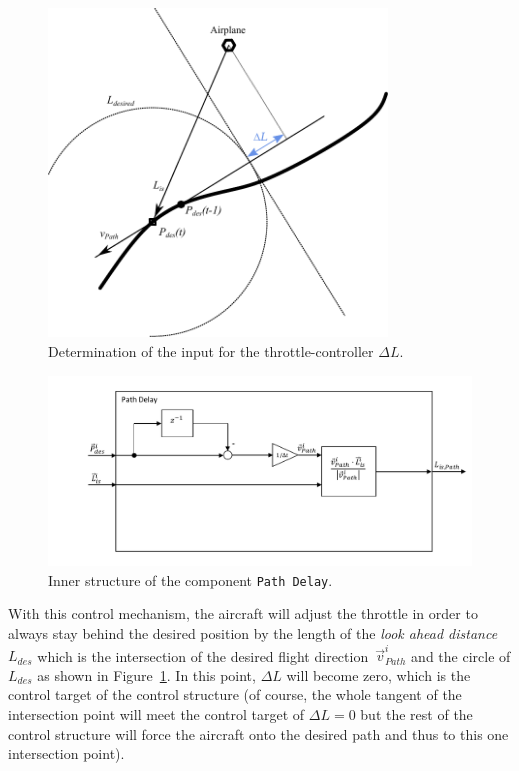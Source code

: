 \documentclass[11pt,a4paper]{scrartcl}		%
\begin{document}
\begin{figure}[bth]
  \begin{center}
  	\includegraphics[width=9cm]{pictures/explanation-diagram-throttle.pdf}
  \end{center}
  \caption{Determination of the input for the throttle-controller $\Delta L$.}
  \label{fig_explanation-diagram-throttle}
\end{figure}

\begin{figure}[tbh]
  \begin{center}
  	\includegraphics[width=14cm]{pictures/Path_Delay.pdf}
  \end{center}
  \caption{Inner structure of the component \texttt{Path Delay}.}
  \label{fig_Path_Delay}
\end{figure} 

With this control mechanism, the aircraft will adjust the throttle in order to always stay behind the desired position by the length of the \textsl{look ahead distance}~$L_{des}$ which is the intersection of the desired flight direction~$\vec{v}_{Path}^i$ and the circle of $L_{des}$ as shown in Figure~\ref{fig_explanation-diagram-throttle}. In this point, $\Delta L$ will become zero, which is the control target of the control structure (of course, the whole tangent of the intersection point will meet the control target of $\Delta L = 0$ but the rest of the control structure will force the aircraft onto the desired path and thus to this one intersection point).  
\end{document}
